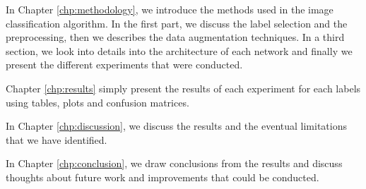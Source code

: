 In Chapter \ref{chp:methodology}, we introduce the methods used in the image classification algorithm. In the first part, we discuss the label selection and the preprocessing, then we describes the data augmentation techniques. In a third section, we look into details into the architecture of each network and finally we present the different experiments that were conducted.  


Chapter  \ref{chp:results} simply present the results of each experiment for each labels using tables, plots and confusion matrices.


In Chapter \ref{chp:discussion}, we discuss the results and the eventual limitations that we have identified.


In Chapter \ref{chp:conclusion}, we draw conclusions from the results and discuss thoughts about future work and improvements that could be conducted. 
